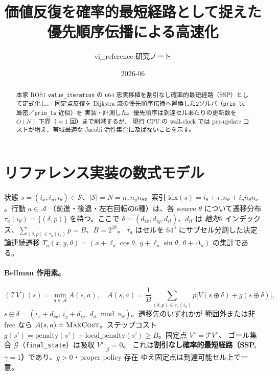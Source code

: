 \documentclass[11pt]{article}
\title{価値反復を確率的最短経路として捉えた優先順序伝播による高速化}
\author{vi\_reference 研究ノート}
\date{2026-06}
\begin{document}
\maketitle

\begin{abstract}
本家 ROS1 \texttt{value\_iteration} の u64 忠実移植を割引なし確率的最短経路（SSP）として定式化し、
固定点反復を Dijkstra 流の優先順序伝播へ置換した2ソルバ（\texttt{prio\_lc} 厳密／\texttt{prio\_ls} 近似）を
実装・計測した。優先順序は到達セルあたりの更新数を $O(N)$ 下界（$\approx 1$ 回）まで削減するが、
現行 CPU の wall-clock では per-update コストが増え、帯域最適な Jacobi 活性集合に及ばないことを示す。
\end{abstract}

\section{リファレンス実装の数式モデル}
状態 $s=(i_x,i_y,i_\theta)\in\mathcal{S}$、$|\mathcal{S}|=N=n_x n_y n_\theta$。索引
$\mathrm{idx}(s)=i_\theta+i_x n_\theta+i_y n_\theta n_x$。行動 $a\in\mathcal{A}$
（前進・後退・左右回転の6種）は、各 source $\theta$ について遷移分布
$\tau_a(i_\theta)=\{(\delta,p)\}$ を持つ。ここで $\delta=(d_{ix},d_{iy},d_{it})$、$d_{it}$ は
\emph{絶対}$\theta$ インデックス、$\sum_{(\delta,p)\in\tau_a(i_\theta)}p=B$、$B=2^{18}$。
$\tau_a$ はセルを $64^3$ にサブセル分割した決定論連続遷移
$T_a(x,y,\theta)=(x+\ell_a\cos\theta,\ y+\ell_a\sin\theta,\ \theta+\Delta_a)$ の集計である。

\paragraph{Bellman 作用素。}
\begin{equation}
(\mathcal{T}V)(s)=\min_{a\in\mathcal{A}}A(s,a),\quad
A(s,a)=\frac1B\sum_{(\delta,p)\in\tau_a(i_\theta)}p\bigl[V(s\oplus\delta)+g(s\oplus\delta)\bigr],
\label{eq:bellman}
\end{equation}
$s\oplus\delta=(i_x{+}d_{ix},\,i_y{+}d_{iy},\,d_{it}\bmod n_\theta)$。遷移先のいずれかが
範囲外または非 free なら $A(s,a)=\textsc{MaxCost}$。ステップコスト
$g(s')=\mathrm{penalty}(s')+\mathrm{local\_penalty}(s')\ge B$。固定点 $V^\star=\mathcal{T}V^\star$、
ゴール集合 $\mathcal{G}$（\texttt{final\_state}）は吸収 $V^\star|_{\mathcal{G}}=0$。
これは\textbf{割引なし確率的最短経路（SSP, $\gamma=1$）}であり、$g>0$・proper policy 存在
ゆえ固定点は到達可能セル上で一意。
\end{document}
